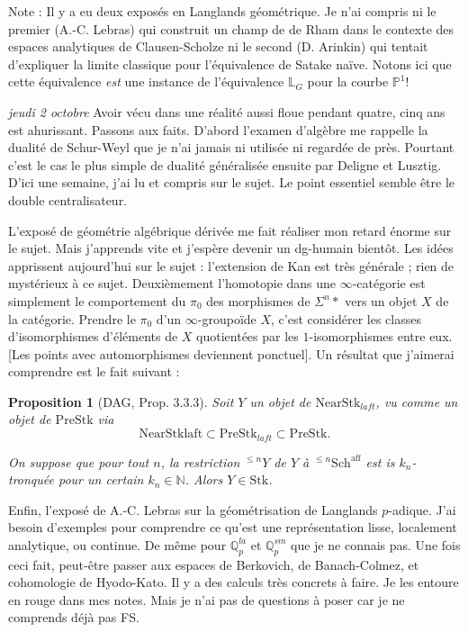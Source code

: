 \documentclass[11.8pt]{amsart}
\theoremstyle{plain}
\newtheorem{prop}[thm]{Proposition}
\theoremstyle{definition}
\theoremstyle{remark}
\begin{document}
Note : Il y a eu deux exposés en Langlands géométrique. Je n'ai compris ni le premier (A.-C. Lebras) qui construit un champ de de Rham dans le contexte des espaces analytiques de Clausen-Scholze ni le second (D. Arinkin) qui tentait d'expliquer la limite classique pour l'équivalence de Satake naïve. Notons ici que cette équivalence \textit{est} une instance de l'équivalence $\mathbb L_G$ pour la courbe $\mathbb P^1$! 
\vspace{10pt}

\textsl{jeudi 2 octobre} \quad Avoir vécu dans une réalité aussi floue pendant quatre, cinq ans est ahurissant. Passons aux faits. D'abord l'examen d'algèbre me rappelle la dualité de Schur-Weyl que je n'ai jamais ni utilisée ni regardée de près. Pourtant c'est le cas le plus simple de dualité généralisée ensuite par Deligne et Lusztig. D'ici une semaine, j'ai lu et compris sur le sujet. Le point essentiel semble être le double centralisateur. 

L'exposé de géométrie algébrique dérivée me fait réaliser mon retard énorme sur le sujet. Mais j'apprends vite et j'espère devenir un dg-humain bientôt. Les idées apprissent aujourd'hui sur le sujet : l'extension de Kan est très générale ; rien de mystérieux à ce sujet. Deuxièmement l'homotopie dans une $\infty$-catégorie est simplement le comportement du $\pi_0$ des morphismes de $\Sigma^n *$ vers un objet $X$ de la catégorie. Prendre le $\pi_0$ d'un $\infty$-groupoïde $X$, c'est considérer les classes d'isomorphismes d'éléments de $X$ quotientées par les $1$-isomorphismes entre eux. [Les points avec automorphismes deviennent ponctuel]. Un résultat que j'aimerai comprendre est le fait suivant : 

\begin{prop}[DAG, Prop. 3.3.3] Soit $Y$ un objet de $\mathrm{NearStk}_{laft}$, vu comme un objet de $\mathrm{PreStk}$ via
$$\mathrm{NearStklaft} \subset \mathrm{PreStk}_{laft} \subset \mathrm{PreStk}.$$

On suppose que pour tout $n$, la restriction $^{\le n}Y$ de $Y$ à $^{\le n}\mathrm{Sch^{aff}}$ est is $k_n$-tronquée pour un certain $k_n\in \mathbb N$. Alors $Y\in \mathrm{Stk}$.

\end{prop}

Enfin, l'exposé de A.-C. Lebras sur la géométrisation de Langlands $p$-adique. J'ai besoin d'exemples pour comprendre ce qu'est une représentation lisse, localement analytique, ou continue. De même pour $\mathbb Q_p^{la}$ et $\mathbb Q_p^{sm}$ que je ne connais pas. Une fois ceci fait, peut-être passer aux espaces de Berkovich, de Banach-Colmez, et cohomologie de Hyodo-Kato. Il y a des calculs très concrets à faire. Je les entoure en rouge dans mes notes. Mais je n'ai pas de questions à poser car je ne comprends déjà pas FS.   
\vspace{10pt}
\end{document}
